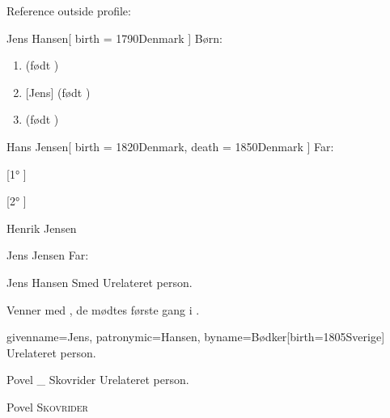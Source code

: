 \documentclass[
	twocolumn
]{article}
\begin{document}
Reference outside profile: 

\begin{gprProfile}{Jens Hansen}[
	birth = {1790}{Denmark}
]
	Børn:
	\begin{enumerate}
	\item {} (født )
	\item {}[Jens] (født )
	\item {} (født )
	\end{enumerate}

\end{gprProfile}

\begin{gprProfile}{Hans Jensen}[
	birth = {1820}{Denmark},
	death = {1850}{Denmark}
]
	Far:

	[1° ]

	[2° ]
\end{gprProfile}

\begin{gprProfile}{Henrik Jensen}
	
	\lipsum[1-5]

\end{gprProfile}

\begin{gprProfile}[id=ABC]{Jens Jensen}
	Far:

\end{gprProfile}

\begin{gprProfile}{Jens Hansen Smed}
	Urelateret person.
	
	Venner med , de mødtes første gang i .

\end{gprProfile}

\begin{gprProfile*}{givenname=Jens, patronymic=Hansen, byname=Bødker}[birth={1805}{Sverige}]
	Urelateret person.

\end{gprProfile*}

\begin{gprProfile}{Povel _ Skovrider}
	Urelateret person.
	
	\gprStyledName
	
	{\gprGivenName{} {\scshape \gprByname}}
	
	{Povel {\scshape Skovrider}}

\end{gprProfile}
\end{document}
